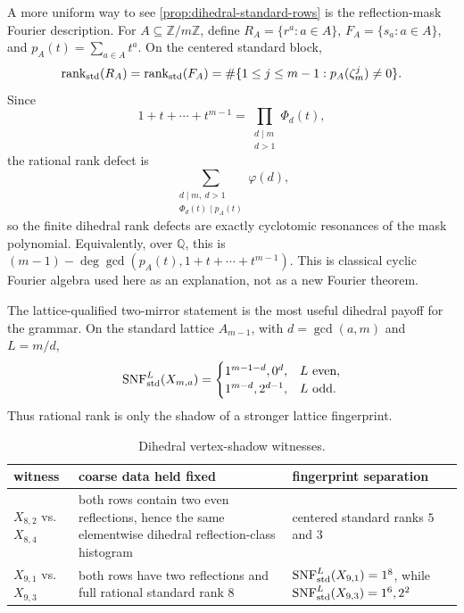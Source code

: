A more uniform way to see \cref{prop:dihedral-standard-rows} is the reflection-mask Fourier description.  For \(A\subseteq\mathbb Z/m\mathbb Z\), define \(R_A=\{r^a:a\in A\}\), \(F_A=\{s_a:a\in A\}\), and \(p_A(t)=\sum_{a\in A}t^a\).  On the centered standard block,
\[
  \operatorname{rank}_{\mathrm{std}}(R_A)=\operatorname{rank}_{\mathrm{std}}(F_A)
  =\#\{1\leq j\leq m-1:p_A(\zeta_m^j)\neq0\}.
\]
Since
\[
  1+t+\cdots+t^{m-1}=\prod_{\substack{d\mid m\\ d>1}}\Phi_d(t),
\]
the rational rank defect is
\[
  \sum_{\substack{d\mid m,\ d>1\\ \Phi_d(t)\mid p_A(t)}}\varphi(d),
\]
so the finite dihedral rank defects are exactly cyclotomic resonances of the mask polynomial.
Equivalently, over \(\mathbb Q\), this is \((m-1)-\deg\gcd(p_A(t),1+t+\cdots+t^{m-1})\).  This is classical cyclic Fourier algebra used here as an explanation, not as a new Fourier theorem.

The lattice-qualified two-mirror statement is the most useful dihedral payoff for the grammar.  On the standard lattice \(A_{m-1}\), with \(d=\gcd(a,m)\) and \(L=m/d\),
\[
\operatorname{SNF}^{L}_{\mathrm{std}}(X_{m,a})=
\begin{cases}
  1^{m-1-d},0^d, & L\text{ even},\\
  1^{m-d},2^{d-1}, & L\text{ odd}.
\end{cases}
\]
Thus rational rank is only the shadow of a stronger lattice fingerprint.

\begin{table}[!htbp]
\centering
\caption{Dihedral vertex-shadow witnesses.}
\label{tab:dihedral-witnesses}
\begin{tabular}{@{}L{0.23\textwidth}L{0.34\textwidth}L{0.33\textwidth}@{}}
\toprule
witness & coarse data held fixed & fingerprint separation \\
\midrule
\(X_{8,2}\) vs. \(X_{8,4}\) & both rows contain two even reflections, hence the same elementwise dihedral reflection-class histogram & centered standard ranks \(5\) and \(3\) \\
\(X_{9,1}\) vs. \(X_{9,3}\) & both rows have two reflections and full rational standard rank \(8\) & \(\operatorname{SNF}^{L}_{\mathrm{std}}(X_{9,1})=1^8\), while \(\operatorname{SNF}^{L}_{\mathrm{std}}(X_{9,3})=1^6,2^2\) \\
\bottomrule
\end{tabular}
\end{table}


